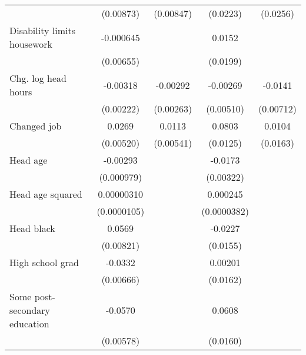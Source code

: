 {\begin{tabular}{l*{4}{c}}
                    &   (0.00873)         &   (0.00847)         &    (0.0223)         &    (0.0256)         \\
\addlinespace
Disability limits housework&   -0.000645         &                     &      0.0152         &                     \\
                    &   (0.00655)         &                     &    (0.0199)         &                     \\
\addlinespace
Chg. log head hours &    -0.00318         &    -0.00292         &    -0.00269         &     -0.0141\sym{**} \\
                    &   (0.00222)         &   (0.00263)         &   (0.00510)         &   (0.00712)         \\
\addlinespace
Changed job         &      0.0269\sym{***}&      0.0113\sym{**} &      0.0803\sym{***}&      0.0104         \\
                    &   (0.00520)         &   (0.00541)         &    (0.0125)         &    (0.0163)         \\
\addlinespace
Head age            &    -0.00293\sym{***}&                     &     -0.0173\sym{***}&                     \\
                    &  (0.000979)         &                     &   (0.00322)         &                     \\
\addlinespace
Head age squared    &  0.00000310         &                     &    0.000245\sym{***}&                     \\
                    & (0.0000105)         &                     & (0.0000382)         &                     \\
\addlinespace
Head black          &      0.0569\sym{***}&                     &     -0.0227         &                     \\
                    &   (0.00821)         &                     &    (0.0155)         &                     \\
\addlinespace
High school grad    &     -0.0332\sym{***}&                     &     0.00201         &                     \\
                    &   (0.00666)         &                     &    (0.0162)         &                     \\
\addlinespace
Some post-secondary education&     -0.0570\sym{***}&                     &      0.0608\sym{***}&                     \\
                    &   (0.00578)         &                     &    (0.0160)         &                     \\

\end{tabular}}
